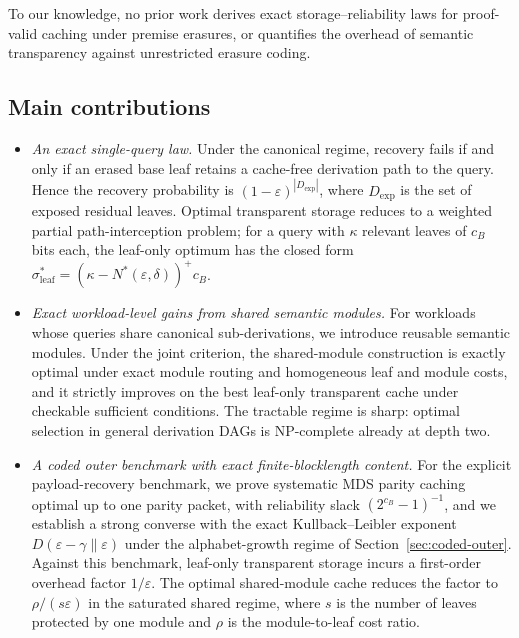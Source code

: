 \documentclass[journal]{IEEEtran}
\numberwithin{equation}{section}
\begin{document}
To our knowledge, no prior work
derives exact storage--reliability laws for proof-valid caching under premise
erasures, or quantifies the overhead of semantic transparency against
unrestricted erasure coding.

\subsection{Main contributions}
\label{subsec:contributions}

\begin{itemize}[leftmargin=5mm]
\item \emph{An exact single-query law.}
Under the canonical regime, recovery fails if and only if an erased base leaf
retains a cache-free derivation path to the query.  Hence the recovery
probability is \((1-\varepsilon)^{|D_{\mathrm{exp}}|}\), where
\(D_{\mathrm{exp}}\) is the set of exposed residual leaves.  Optimal
transparent storage reduces to a weighted partial path-interception problem;
for a query with \(\kappa\) relevant leaves of \(c_B\) bits each, the
leaf-only optimum has the closed form
\(\sigma_{\mathrm{leaf}}^*=(\kappa-N^*(\varepsilon,\delta))^+c_B\).

\item \emph{Exact workload-level gains from shared semantic modules.}
For workloads whose queries share canonical sub-derivations, we introduce
reusable semantic modules.  Under the joint criterion, the shared-module
construction is exactly optimal under exact module routing and homogeneous
leaf and module costs, and it strictly improves on the best leaf-only
transparent cache under checkable sufficient conditions.  The tractable
regime is sharp: optimal selection in general derivation DAGs is
NP-complete already at depth two.

\item \emph{A coded outer benchmark with exact finite-blocklength content.}
For the explicit payload-recovery benchmark, we prove systematic MDS parity
caching optimal up to one parity packet, with reliability slack
\((2^{c_B}-1)^{-1}\), and we establish a strong converse with the exact
Kullback--Leibler exponent \(D(\varepsilon-\gamma\|\varepsilon)\) under the
alphabet-growth regime of Section~\ref{sec:coded-outer}.  Against this
benchmark, leaf-only transparent storage incurs a first-order overhead factor
\(1/\varepsilon\).  The optimal shared-module cache reduces the factor to
\(\rho/(s\varepsilon)\) in the saturated shared regime, where \(s\) is the
number of leaves protected by one module and \(\rho\) is the module-to-leaf
cost ratio.


\end{itemize}
\end{document}
